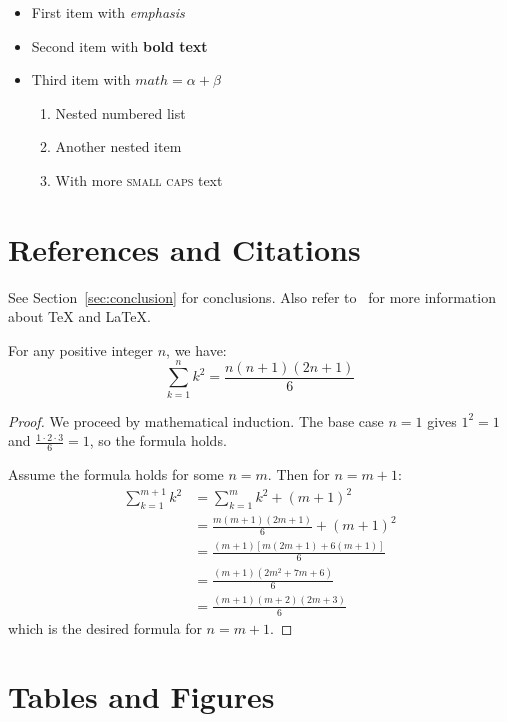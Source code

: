 \documentclass{article}
\begin{document}
\begin{itemize}
    \item First item with \emph{emphasis}
    \item Second item with \textbf{bold text}
    \item Third item with $math = \alpha + \beta$
    \begin{enumerate}
        \item Nested numbered list
        \item Another nested item
        \item With more \textsc{small caps} text
    \end{enumerate}
\end{itemize}

\section{References and Citations}

See Section~\ref{sec:conclusion} for conclusions. Also refer to~\cite{knuth1986texbook} 
for more information about \TeX{} and \LaTeX{}.

\begin{theorem}
    For any positive integer $n$, we have:
    \[ \sum_{k=1}^n k^2 = \frac{n(n+1)(2n+1)}{6} \]
\end{theorem}

\begin{proof}
    We proceed by mathematical induction. The base case $n=1$ gives $1^2 = 1$ and 
    $\frac{1 \cdot 2 \cdot 3}{6} = 1$, so the formula holds.
    
    Assume the formula holds for some $n = m$. Then for $n = m + 1$:
    \begin{align}
        \sum_{k=1}^{m+1} k^2 &= \sum_{k=1}^m k^2 + (m+1)^2 \\
        &= \frac{m(m+1)(2m+1)}{6} + (m+1)^2 \\
        &= \frac{(m+1)[m(2m+1) + 6(m+1)]}{6} \\
        &= \frac{(m+1)(2m^2 + 7m + 6)}{6} \\
        &= \frac{(m+1)(m+2)(2m+3)}{6}
    \end{align}
    which is the desired formula for $n = m + 1$.
\end{proof}

\section{Tables and Figures}
\end{document}
